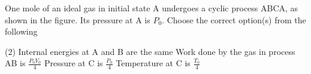 
\item One mole of an ideal gas in initial state A undergoes a cyclic process ABCA, as shown in the figure. Its pressure at A is \( P_0 \). Choose the correct option(s) from the following
    \begin{center}
    \end{center}
    \begin{tasks}(2)
        \task Internal energies at A and B are the same
        \task Work done by the gas in process AB is \( \frac{P_0 V_0}{4} \)
        \task Pressure at C is \( \frac{P_0}{4} \)
        \task Temperature at C is \( \frac{T_0}{4} \)
    \end{tasks}
